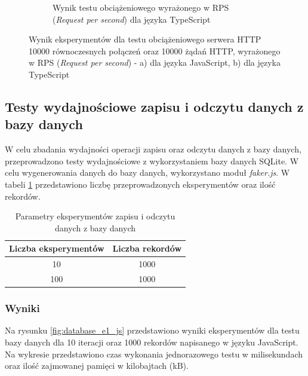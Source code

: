 \begin{figure}[H]
\begin{subfigure}[b]{0.4\textwidth}
    \caption{Wynik testu obciążeniowego wyrażonego w RPS (\textit{Request per second}) dla języka TypeScript}
    \label{fig:server_e3_ts}
  \end{subfigure}
  \caption{Wynik eksperymentów dla testu obciążeniowego serwera HTTP 10000 równoczesnych połączeń oraz 10000 żądań HTTP, wyrażonego w RPS (\textit{Request per second}) - a) dla języka JavaScript, b) dla języka TypeScript}
  \label{fig:server_e3}
\end{figure}

\subsection{Testy wydajnościowe zapisu i odczytu danych z bazy danych}
W celu zbadania wydajności operacji zapisu oraz odczytu danych z bazy danych, przeprowadzono testy wydajnościowe z wykorzystaniem bazy danych SQLite. W celu wygenerowania danych do bazy danych, wykorzystano moduł \textit{faker.js}. W tabeli \ref{tab:database_experiments} przedstawiono liczbę przeprowadzonych eksperymentów oraz ilość rekordów.

\begin{table}[H]
  \centering
  \caption{Parametry eksperymentów zapisu i odczytu danych z bazy danych}
  \begin{tabular}{|c|c|}
    \hline
    \textbf{Liczba eksperymentów} & \textbf{Liczba rekordów}\\ \hline
    10 & 1000 \\ \hline
    100 & 1000 \\ \hline
  \end{tabular}
  \label{tab:database_experiments}
\end{table}

\subsubsection{Wyniki}
Na rysunku \ref{fig:database_e1_js} przedstawiono wyniki eksperymentów dla testu bazy danych dla 10 iteracji oraz 1000 rekordów napisanego w języku JavaScript. Na wykresie przedstawiono czas wykonania jednorazowego testu w milisekundach oraz ilość zajmowanej pamięci w kilobajtach (kB).

